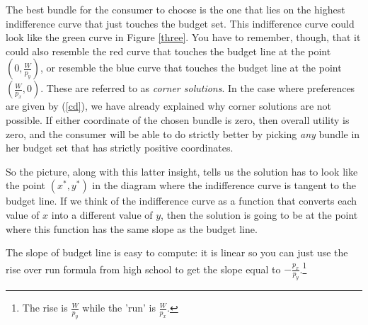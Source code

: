 \documentclass[12pt]{article}
\newcommand{\tmem}[1]{{\em #1\/}}
\begin{document}
The best bundle for the consumer to choose is the one that lies on the highest
indifference curve that just touches the budget set. This indifference curve
could look like the green curve in Figure \ref{three}. You have to remember,
though, that it could also resemble the red curve that touches the budget line
at the point $( 0, \frac{W}{p_y} )$, or resemble the blue curve that touches the
budget line at the point $( \frac{W}{p_x}, 0 )$. These are referred to as
{\tmem{corner solutions}}. In the case where preferences are given by
(\ref{cd}), we have already explained why corner solutions are not possible.
If either coordinate of the chosen bundle is zero, then overall utility is
zero, and the consumer will be able to do strictly better by picking
{\tmem{any}} bundle in her budget set that has strictly positive coordinates.

So the picture, along with this latter insight, tells us the solution has to
look like the point $( x^{\ast}, y^{\ast} )$ in the diagram where the
indifference curve is tangent to the budget line. If we think of the
indifference curve as a function that converts each value of $x$ into a
different value of $y$, then the solution is going to be at the point where
this function has the same slope as the budget line.

The slope of budget line is easy to compute: it is linear so you can just
use the rise over run formula from high school to get the slope equal to $-
\frac{p_x}{p_y}$.{\footnote{The rise is $\frac{W}{p_y}$ while the 'run' is
$\frac{W}{p_x}$.}}
\end{document}
